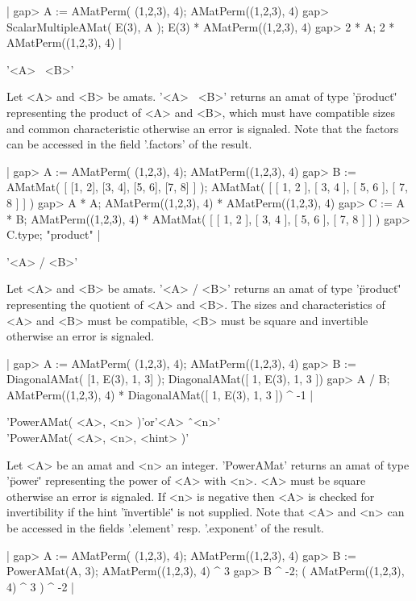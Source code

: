 |    gap> A := AMatPerm( (1,2,3), 4);
    AMatPerm((1,2,3), 4)
    gap> ScalarMultipleAMat( E(3), A );
    E(3) * AMatPerm((1,2,3), 4)
    gap> 2 * A;
    2 * AMatPerm((1,2,3), 4) |


'<A> \*\ <B>'

Let <A> and <B> be amats. '<A> \*\ <B>' returns an amat of
type '\"product\"' representing the product of <A> and <B>,
which must have compatible sizes and common characteristic
otherwise an error is signaled.
Note that the factors can be accessed in the field 
'.factors' of the result.

|    gap> A := AMatPerm( (1,2,3), 4);
    AMatPerm((1,2,3), 4)
    gap> B := AMatMat( [ [1, 2], [3, 4], [5, 6], [7, 8] ] );
    AMatMat(
      [ [ 1, 2 ], [ 3, 4 ], [ 5, 6 ], [ 7, 8 ] ]
    )
    gap> A * A;
    AMatPerm((1,2,3), 4) *
    AMatPerm((1,2,3), 4)
    gap> C := A * B;
    AMatPerm((1,2,3), 4) *
    AMatMat(
      [ [ 1, 2 ], [ 3, 4 ], [ 5, 6 ], [ 7, 8 ] ]
    ) 
    gap> C.type;
    "product" |

'<A> / <B>'

Let <A> and <B> be amats. '<A> / <B>' returns an amat of
type '\"product\"' representing the quotient of <A> and <B>.
The sizes and characteristics of <A> and <B> must be compatible, 
<B> must be square and invertible otherwise an error is signaled.

|    gap> A := AMatPerm( (1,2,3), 4);
    AMatPerm((1,2,3), 4)
    gap> B := DiagonalAMat( [1, E(3), 1, 3] );
    DiagonalAMat([ 1, E(3), 1, 3 ])
    gap> A / B;
    AMatPerm((1,2,3), 4) *
    DiagonalAMat([ 1, E(3), 1, 3 ]) ^ -1 |


'PowerAMat( <A>, <n> )'\quad or\quad '<A> \^\ <n>'\\
'PowerAMat( <A>, <n>, <hint> )'

Let <A> be an amat and <n> an integer. 'PowerAMat' returns 
an amat of type '\"power\"' representing the power of <A> with <n>.
<A> must be square otherwise an error is signaled. If <n> is 
negative then <A> is checked for invertibility if the
hint '\"invertible\"' is not supplied.
Note that <A> and <n> can be accessed in the fields 
'.element' resp. '.exponent' of the result.

|    gap> A := AMatPerm( (1,2,3), 4);
    AMatPerm((1,2,3), 4)
    gap> B := PowerAMat(A, 3);      
    AMatPerm((1,2,3), 4) ^ 3
    gap> B ^ -2;
    ( AMatPerm((1,2,3), 4) ^ 3
    ) ^ -2 |

